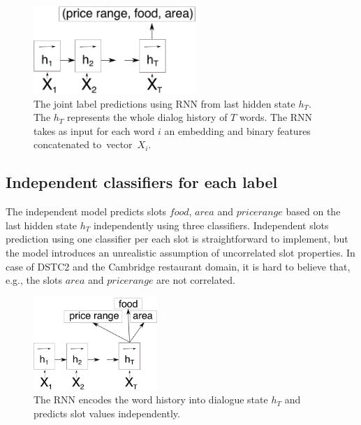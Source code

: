 \documentclass{itatnew}
\begin{document}
\begin{figure}
\vspace{-0.80em}
\begin{center}
\includegraphics[height=9em]{encoder_joint}
\caption{The joint label predictions using RNN from last hidden state $h_T$. The $h_T$ represents the whole dialog history of $T$ words. The RNN takes as input for each word $i$ an embedding and binary features concatenated to~vector~$X_{i}$.}
\end{center}
\vspace{-0.70em}
\label{fig_encjoint}
\end{figure}

\subsection{Independent classifiers for each label}
\label{sec:indep}
The independent model predicts slots $food$, $area$ and $price range$ based on the last hidden state $h_{T}$ independently using three classifiers.
Independent slots prediction using one classifier per each slot is straightforward to implement, but the model introduces an unrealistic assumption of uncorrelated slot properties.
In case of DSTC2 and the Cambridge restaurant domain, it is hard to believe that, e.g., the slots $area$ and $price range$ are not correlated.

\begin{figure}
\begin{center}
\includegraphics[height=9.5em]{encoder}
\caption{The RNN encodes the word history into dialogue state $h_T$ and predicts slot values independently.}
\end{center}
\vspace{-0.80em}
\label{fig:encind}
\end{figure}
\end{document}

